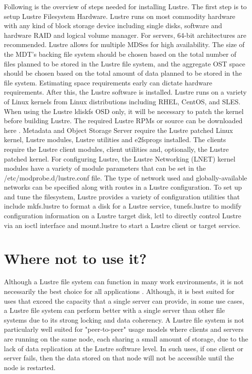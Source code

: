 \documentclass[9pt,twocolumn,twoside]{styles/osajnl}
\begin{document}
Following is the overview of steps needed for installing Lustre.  The
first step is to setup Lustre Filesystem Hardware. Lustre runs on most
commodity hardware with any kind of block storage device including
single disks, software and hardware RAID and logical volume
manager. For servers, 64-bit architectures are recommended. Lustre
allows for multiple MDSes for high availability. The size of the MDT’s
backing file system should be chosen based on the total number of
files planned to be stored in the Lustre file system, and the
aggregate OST space should be chosen based on the total amount of data
planned to be stored in the file system. Estimating space requirements
early can dictate hardware requirements. After this, the Lustre
software is installed. Lustre runs on a variety of Linux kernels from
Linux distributions including RHEL, CentOS, and SLES.  When using the
Lustre ldiskfs OSD only, it will be necessary to patch the kernel
before building Lustre. The required Lustre RPMs or source can be
downloaded here \cite{www-download}. Metadata and Object Storage
Server require the Lustre patched Linux kernel, Lustre modules, Lustre
utilities and e2fsprogs installed. The clients require the Lustre
client modules, client utilities and, optionally, the Lustre patched
kernel. For configuring Lustre, the Lustre Networking (LNET) kernel
modules have a variety of module parameters that can be set in the
/etc/modprobe.d/lustre.conf file. The type of network used and
globally-available networks can be specified along with routes in a
Lustre configuration. To set up and tune the filesystem, Lustre
provides a variety of configuration utilities that include mkfs.lustre
to format a disk for a Lustre service, tunefs.lustre to modify
configuration information on a Lustre target disk, lctl to directly
control Lustre via an ioctl interface and mount.lustre to start a
Lustre client or target service.

\section{Where not to use it?}

Although a Lustre file system can function in many work environments,
it is not necessarily the best choice for all applications
\cite{www-manual}. Although, it is best suited for uses that exceed
the capacity that a single server can provide, in some use cases, a
Lustre file system can perform better with a single server than other
file systems due to its strong locking and data coherency. A Lustre
file system is not particularly well suited for "peer-to-peer" usage
models where clients and servers are running on the same node, each
sharing a small amount of storage, due to the lack of data replication
at the Lustre software level. In such uses, if one client or server
fails, then the data stored on that node will not be accessible until
the node is restarted.
\end{document}
